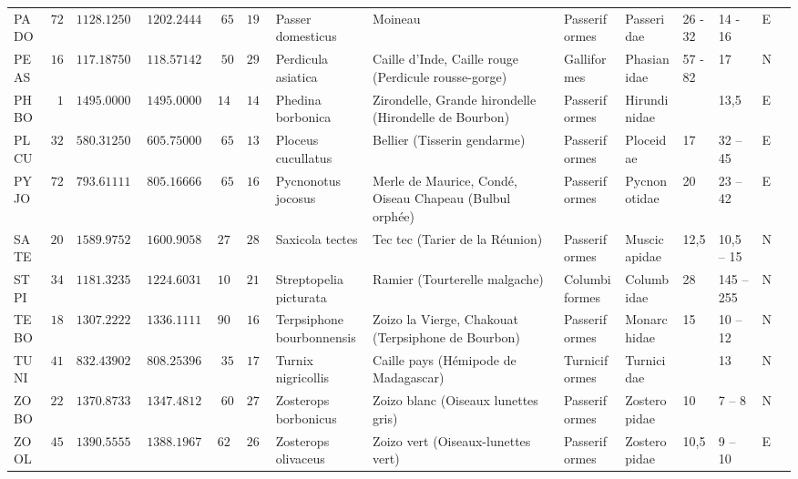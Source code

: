 \begin{table}[!tbp]
\begin{center}
\begin{tabular}{lrrrrrllllllll}
PADO&$ 72$&$1128.125000000000$&$1202.244444444445$&$  65$&$1960$&Passer domesticus&Moineau&Passeriformes&Passeridae&26 - 32&14 - 16&E&\tabularnewline
PEAS&$ 16$&$ 117.187500000000$&$ 118.571428571429$&$  50$&$ 290$&Perdicula asiatica&Caille d’Inde, Caille rouge (Perdicule rousse-gorge)&Galliformes&Phasianidae&57 - 82&17&N&\tabularnewline
PHBO&$  1$&$1495.000000000000$&$1495.000000000000$&$1495$&$1495$&Phedina borbonica&Zirondelle, Grande hirondelle (Hirondelle de Bourbon)&Passeriformes&Hirundinidae&&13,5&E&\tabularnewline
PLCU&$ 32$&$ 580.312500000000$&$ 605.750000000000$&$  65$&$1345$&Ploceus cucullatus&Bellier (Tisserin gendarme)&Passeriformes&Ploceidae&17&32 – 45&E&\tabularnewline
PYJO&$ 72$&$ 793.611111111111$&$ 805.166666666667$&$  65$&$1690$&Pycnonotus jocosus&Merle de Maurice, Condé, Oiseau Chapeau (Bulbul orphée)&Passeriformes&Pycnonotidae&20&23 – 42&E&\tabularnewline
SATE&$202$&$1589.975247524752$&$1600.905861456483$&$ 270$&$2880$&Saxicola tectes&Tec tec (Tarier de la Réunion)&Passeriformes&Muscicapidae&12,5&10,5 – 15&N&\tabularnewline
STPI&$ 34$&$1181.323529411765$&$1224.603174603175$&$ 100$&$2150$&Streptopelia picturata&Ramier (Tourterelle malgache)&Columbiformes&Columbidae&28&145 – 255&N&\tabularnewline
TEBO&$ 18$&$1307.222222222222$&$1336.111111111111$&$ 900$&$1680$&Terpsiphone bourbonnensis&Zoizo la Vierge, Chakouat (Terpsiphone de Bourbon)&Passeriformes&Monarchidae&15&10 – 12&N&\tabularnewline
TUNI&$ 41$&$ 832.439024390244$&$ 808.253968253968$&$  35$&$1700$&Turnix nigricollis&Caille pays (Hémipode de Madagascar)&Turniciformes&Turnicidae&&13&N&\tabularnewline
ZOBO&$229$&$1370.873362445415$&$1347.481203007519$&$  60$&$2700$&Zosterops borbonicus&Zoizo blanc (Oiseaux lunettes gris)&Passeriformes&Zosteropidae&10&7 – 8&N&\tabularnewline
ZOOL&$ 45$&$1390.555555555556$&$1388.196721311475$&$ 620$&$2600$&Zosterops olivaceus&Zoizo vert (Oiseaux-lunettes vert)&Passeriformes&Zosteropidae&10,5&9 – 10&E&\tabularnewline
\hline
\end{tabular}

\end{center}

\end{table}

